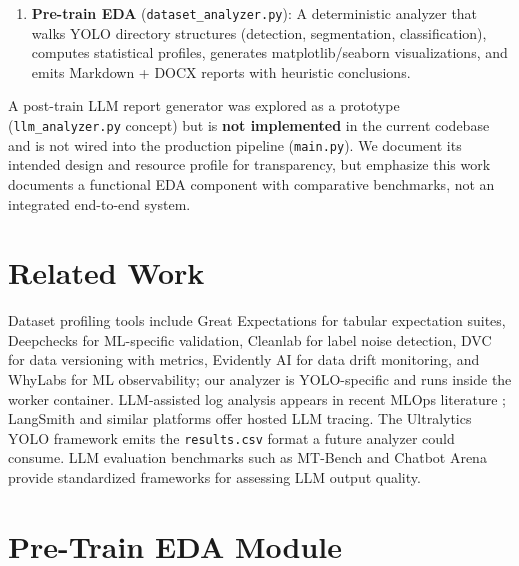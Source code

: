 \documentclass[10pt,twocolumn,letterpaper]{article}
\begin{document}
\begin{enumerate}
    \item \textbf{Pre-train EDA} (\texttt{dataset\_analyzer.py}): A deterministic analyzer that walks YOLO directory structures (detection, segmentation, classification), computes statistical profiles, generates matplotlib/seaborn visualizations, and emits Markdown + DOCX reports with heuristic conclusions.
\end{enumerate}

A post-train LLM report generator was explored as a prototype (\texttt{llm\_analyzer.py} concept) but is \textbf{not implemented} in the current codebase and is not wired into the production pipeline (\texttt{main.py}). We document its intended design and resource profile for transparency, but emphasize this work documents a functional EDA component with comparative benchmarks, not an integrated end-to-end system.

\section{Related Work}
Dataset profiling tools include Great Expectations \cite{greatexpectations2023} for tabular expectation suites, Deepchecks \cite{deepchecks2023} for ML-specific validation, Cleanlab \cite{northcutt2021cleanlab} for label noise detection, DVC \cite{kuprie2022dvc} for data versioning with metrics, Evidently AI \cite{evidently2023} for data drift monitoring, and WhyLabs \cite{whylabs2023} for ML observability; our analyzer is YOLO-specific and runs inside the worker container. LLM-assisted log analysis appears in recent MLOps literature \cite{symeonidis2022mlops}; LangSmith \cite{langsmith2023} and similar platforms offer hosted LLM tracing. The Ultralytics YOLO framework \cite{jocher2023ultralytics} emits the \texttt{results.csv} format a future analyzer could consume. LLM evaluation benchmarks such as MT-Bench \cite{zheng2023judging} and Chatbot Arena \cite{chiang2024chatbot} provide standardized frameworks for assessing LLM output quality.

\section{Pre-Train EDA Module}
\end{document}
